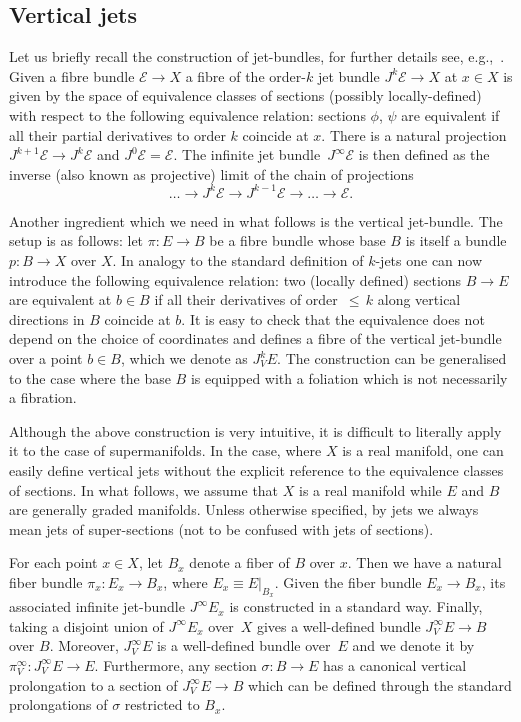 \documentclass[10pt,a4paper]{amsart}
\numberwithin{equation}{section}
\theoremstyle{definition}
\newcommand{\changed}[1]{{#1}}
\renewcommand{\leq}{\,{\leqslant}\,}
\def\cE{\mathcal{E}}
\begin{document}
\subsection{Vertical jets} \label{sec:vert-jets}
\changed{Let us briefly recall the construction of jet-bundles, for further details see, e.g.,~\cite{Andersonbook, Vinogradov1981}. Given a fibre bundle $\mathcal{E}\rightarrow X$ a fibre of the order-$k$ jet bundle $J^k\mathcal{E} \rightarrow X$ at $x \in X$ is given by the space of equivalence classes of sections (possibly locally-defined) with respect to the following equivalence relation: sections $\phi$, $\psi$ are equivalent if all their partial derivatives to order $k$ coincide at $x$. There is a natural projection $J^{k+1}\cE \to J^{k}\cE$ and $J^0\cE=\cE$.} \changed{The infinite jet bundle~$J^{\infty}\mathcal{E}$ is then defined as the inverse (also known as projective) limit of the chain of projections
\[
\dots \rightarrow J^k\mathcal{E} \rightarrow J^{k-1}\mathcal{E} \rightarrow \dots \rightarrow \mathcal{E}.
\]}

Another ingredient which we need in what follows is the vertical jet-bundle. The setup is as follows: let $\pi\colon E\rightarrow B$ be a fibre bundle whose base $B$ is itself a bundle $p\colon B\rightarrow X$ over $X$. In analogy to the standard definition of $k$-jets one can now introduce the following equivalence relation: two (locally defined) sections $B\to E$ are equivalent at $b\in B$ if all their derivatives of order $\leq k$ along vertical directions in $B$ coincide at $b$. It is easy to check that the equivalence does not depend on the choice of coordinates and defines a fibre of the vertical jet-bundle \changed{over a point $b\in B$, which we denote as $J_V^kE$}. The construction can be generalised to the case where the base $B$ is equipped with a foliation which is not necessarily a fibration.

Although the above construction is very intuitive, it is difficult to literally apply it to the case of supermanifolds. In the case, where $X$ is a real manifold, one can easily define vertical jets without the explicit reference to the equivalence classes of sections. In what follows, we assume that $X$ is a real manifold while $E$ and $B$ are generally graded manifolds. Unless otherwise specified, by jets we always mean jets of super-sections (not to be confused with jets of sections).

For each point $x\in X$, let $B_x$ denote a fiber of $B$ over $x$. Then we have a natural fiber bundle $\pi_x\colon E_x\rightarrow B_x$, where $E_x\equiv E|_{B_x}$. Given the fiber bundle $E_x \rightarrow B_x$, its associated infinite jet-bundle $J^{\infty}E_x$ is constructed in a standard way. Finally, taking a disjoint union of $J^{\infty}E_x$ over~$X$ gives a well-defined bundle $J^{\infty}_VE\rightarrow B$ over $B$. Moreover, $J^{\infty}_VE$ is a well-defined bundle over~$E$ and we denote it by $\pi^{\infty}_V\colon J^{\infty}_VE\rightarrow E$.
Furthermore, any section $\sigma\colon B\rightarrow E$ has a canonical vertical prolongation to a section of $J^{\infty}_VE\rightarrow B$ which can be defined through the standard prolongations of $\sigma$ restricted to $B_x$.
\end{document}
